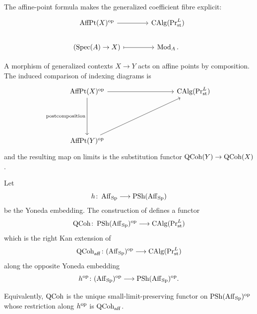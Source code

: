 The affine-point formula makes the generalized coefficient fibre explicit:
\[
\begin{tikzcd}[column sep=large]
    \operatorname{AffPt}(X)^{\op}
        \arrow[r]
    &
    \CAlg(\Pr^L_{\mathrm{st}})
    \\
    (\Spec(A)\to X)
        \arrow[r, mapsto]
    &
    \Mod_A.
\end{tikzcd}
\]

A morphism of generalized contexts \(X\to Y\) acts on affine points by
composition. The induced comparison of indexing diagrams is
\[
\begin{tikzcd}[column sep=huge, row sep=large]
    \operatorname{AffPt}(X)^{\op}
        \arrow[rr]
        \arrow[dd, "{\text{postcomposition}}"']
    &&
    \CAlg(\Pr^L_{\mathrm{st}})
    \\
    \\
    \operatorname{AffPt}(Y)^{\op}
        \arrow[uurr]
    &&
\end{tikzcd}
\]
and the resulting map on limits is the substitution functor
\(\operatorname{QCoh}(Y)\to\operatorname{QCoh}(X)\).

\begin{theorem}
\label{thm:qcoh-affine-right-kan-extension}
Let
\[
    h
    \colon
    \operatorname{Aff}_{\operatorname{Sp}}
    \longrightarrow
    \operatorname{PSh}(\operatorname{Aff}_{\operatorname{Sp}})
\]
be the Yoneda embedding. The construction of
 defines a functor
\[
    \operatorname{QCoh}
    \colon
    \operatorname{PSh}(\operatorname{Aff}_{\operatorname{Sp}})^{\mathrm{op}}
    \longrightarrow
    \operatorname{CAlg}(\operatorname{Pr}^L_{\mathrm{st}})
\]
which is the right Kan extension of
\[
    \operatorname{QCoh}_{\mathrm{aff}}
    \colon
    (\operatorname{Aff}_{\operatorname{Sp}})^{\mathrm{op}}
    \longrightarrow
    \operatorname{CAlg}(\operatorname{Pr}^L_{\mathrm{st}})
\]
along the opposite Yoneda embedding
\[
    h^{\mathrm{op}}
    \colon
    (\operatorname{Aff}_{\operatorname{Sp}})^{\mathrm{op}}
    \longrightarrow
    \operatorname{PSh}(\operatorname{Aff}_{\operatorname{Sp}})^{\mathrm{op}}.
\]

Equivalently, $\operatorname{QCoh}$ is the unique small-limit-preserving functor on
$\operatorname{PSh}(\operatorname{Aff}_{\operatorname{Sp}})^{\mathrm{op}}$ whose restriction along
$h^{\mathrm{op}}$ is $\operatorname{QCoh}_{\mathrm{aff}}$.
\end{theorem}


